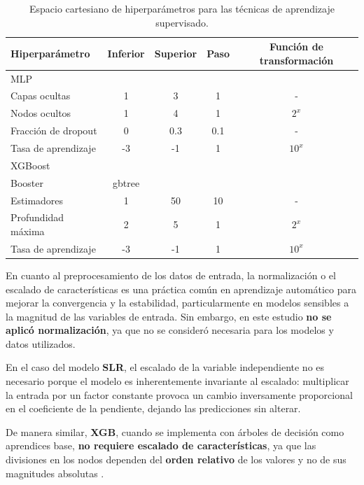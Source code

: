 \begin{table}[ht]
\caption{Espacio cartesiano de hiperparámetros para las técnicas de aprendizaje supervisado.}
\label{tab:gridsearch}
\centering
\resizebox{\linewidth}{!} {
\def\arraystretch{1.5}
\begin{tabular}{lcccc}
\hline
\textbf{Hiperparámetro} & \textbf{Inferior} & \textbf{Superior} & \textbf{Paso} & \textbf{Función de transformación} \\
\hline
MLP\\
\hline
 Capas ocultas        & 1    & 3     & 1   & - \\
 Nodos ocultos        & 1    & 4     & 1   & $2^{x}$ \\
 Fracción de dropout  & 0    & 0.3   & 0.1 & - \\
 Tasa de aprendizaje  & -3   & -1    & 1   & $10^{x}$ \\
\hline
XGBoost\\
\hline
Booster               & gbtree & & & \\
 Estimadores          & 1    & 50    & 10  & - \\
 Profundidad máxima   & 2    & 5     & 1   & $2^{x}$ \\
 Tasa de aprendizaje  & -3   & -1    & 1   & $10^{x}$ \\
\hline
\end{tabular}}
\end{table}

En cuanto al preprocesamiento de los datos de entrada, la normalización o el escalado de características es una práctica común en aprendizaje automático para mejorar la convergencia y la estabilidad, particularmente en modelos sensibles a la magnitud de las variables de entrada. Sin embargo, en este estudio \textbf{no se aplicó normalización}, ya que no se consideró necesaria para los modelos y datos utilizados.  

En el caso del modelo \textbf{SLR}, el escalado de la variable independiente no es necesario porque el modelo es inherentemente invariante al escalado: multiplicar la entrada por un factor constante provoca un cambio inversamente proporcional en el coeficiente de la pendiente, dejando las predicciones sin alterar.  

De manera similar, \textbf{XGB}, cuando se implementa con árboles de decisión como aprendices base, \textbf{no requiere escalado de características}, ya que las divisiones en los nodos dependen del \textbf{orden relativo} de los valores y no de sus magnitudes absolutas \cite{Soria2022, Chen2016}.  

